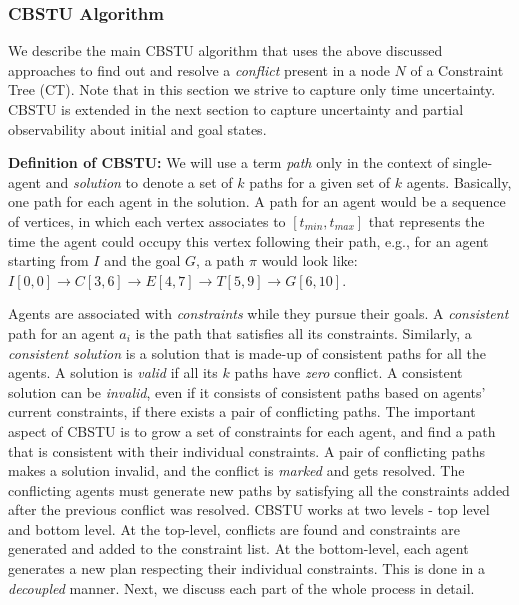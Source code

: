 \documentclass{article}
\begin{document}
{%

\subsubsection{CBSTU Algorithm}
We describe the main CBSTU algorithm that uses the above discussed approaches to find out and resolve a \emph{conflict} present in a node $N$ of a Constraint Tree (CT). Note that in this section we strive to capture only time uncertainty. CBSTU is extended in the next section to capture uncertainty and partial observability about initial and goal states. 

\noindent \textbf{Definition of CBSTU:} 
We will use a term \emph{path} only in the context of single-agent and \emph{solution} to denote a set of $k$ paths for a given set of $k$ agents. 
Basically, one path for each agent in the solution. A path for an agent would be a sequence of vertices, in which each vertex associates to $[t_{min},t_{max}]$ that represents the time the agent could occupy this vertex following their path, e.g., for an agent starting from $I$ and the goal $G$, a path $\pi$ would look like: $I[0,0] \rightarrow C[3,6] \rightarrow E[4,7] \rightarrow T[5,9] \rightarrow G[6,10]$. 

Agents are associated with \emph{constraints} while they pursue their goals. A \emph{consistent} path for an agent $a_i$ is the path that satisfies all its constraints. Similarly, a \emph{consistent solution} is a solution that is made-up of consistent paths for all the agents. A solution is \emph{valid} if all its $k$ paths have \emph{zero} conflict. 
A consistent solution can be \emph{invalid}, even if it consists of consistent paths based on agents' current constraints, if there exists a pair of conflicting paths.
The important aspect of CBSTU is to grow a set of constraints for each agent, and find a path that is consistent with their individual constraints. A pair of conflicting paths makes a solution invalid, and the conflict is \emph{marked} and gets resolved. 
The conflicting agents must generate new paths by satisfying all the constraints added after the previous conflict was resolved.
CBSTU works at two levels - top level and bottom level. 
At the top-level, conflicts are found and constraints are generated and added to the constraint list. 
At the bottom-level, each agent generates a new plan respecting their individual constraints. 
This is done in a \emph{decoupled} manner. Next, we discuss each part of the whole process in detail.

}
\end{document}
